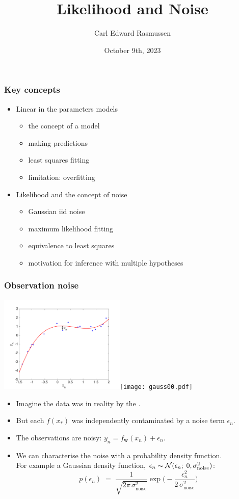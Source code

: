 

\title{Likelihood and Noise}
\author{Carl Edward Rasmussen}
\date{October 9th, 2023}



\begin{frame}
\titlepage
\end{frame}

\begin{frame}
\frametitle{Key concepts}
\begin{itemize}
\item Linear in the parameters models
\begin{itemize}
\item the concept of a model
\item making predictions
\item least squares fitting
\item limitation: overfitting
\end{itemize}
\item Likelihood and the concept of noise
\begin{itemize}
\item Gaussian iid noise
\item maximum likelihood fitting
\item equivalence to least squares
\item motivation for inference with multiple hypotheses
\end{itemize}
\end{itemize}
\end{frame}

\begin{frame}
\frametitle{Observation noise}

\centerline{\includegraphics[width=0.45\textwidth]{toy_data_illustrate_Gaussian_noise.pdf}\;\texttt{[image: gauss00.pdf]}}
\begin{itemize}
\item Imagine the data was in reality  by the .
\item But each $f(x_*)$ was independently contaminated by a noise term $\epsilon_n$.
\item The observations are noisy: $y_n=f_{\bm w}(x_n)+\epsilon_n$.
\item We can characterise the noise with a probability density function.\\ 
For example a Gaussian density function, $\epsilon_n\sim\mathcal{N}(\epsilon_n
; \;0, \sigma_\mathrm{noise}^2)$:
\[
p(\epsilon_n)\;=\;\frac{1}{\sqrt{2\pi\,\sigma_\mathrm{noise}^2}}
\exp\big(-\frac{\epsilon_n^2}{2\,\sigma_\mathrm{noise}^2}\big)
\]
\end{itemize}
\end{frame}

